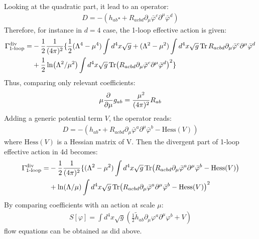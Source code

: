 Looking at the quadratic part, it lead to an operator:
\begin{align}
    D = -(h_{ab} \square + R_{acbd} \partial _{\mu} \bar{\varphi}^{c} \partial ^{\mu} \bar{\varphi}^{d} )
\end{align}
Therefore, for instance in $d=4$ case, the 1-loop effective action is given:
\begin{align}
    \begin{split}
    \Gamma _{\text{1-loop}} ^{\text{div}} = &-\frac{1}{2} \frac{1}{(4\pi)^2}\lbrace \frac{1}{2}(\Lambda^4 - \mu ^{4}) \int d^{4}x \sqrt{g} + (\Lambda ^{2} - \mu ^{2}) \int d^{4}x \sqrt{g} \Tr R_{acbd} \partial _{\mu} \bar{\varphi}^{c} \partial ^{\mu} \bar{\varphi}^{d} \\ 
    &+ \frac{1}{2} \ln (\Lambda ^{2} / \mu ^{2})\int d^{4}x  \sqrt{g} \Tr (R_{acbd} \partial _{\mu} \bar{\varphi}^{c} \partial ^{\mu} \bar{\varphi}^{d}) ^{2} \rbrace
    \end{split}
\end{align}
Thus, comparing only relevant coefficients:
\begin{align}
    \mu \pdv{\mu} g_{ab} = \frac{\mu ^{2}} {(4\pi)^2} R_{ab}
\end{align}
Adding a generic potential term $V$, the operator reads:
\begin{align}
    D = -(h_{ab}\square + R_{acbd} \partial_{\mu} \bar{\varphi} ^{a} \partial^{\mu} \bar{\varphi} ^{b} - \text{Hess} (V))
\end{align}
where $\text{Hess}(V)$ is a Hessian matrix of V. Then the divergent part of 1-loop effective action in 4d becomes:
\begin{align}
    \begin{split}
    \Gamma_{\text{1-loop}}^{\text{div}} = &-\frac{1}{2} \frac{1}{(4\pi)^{2}}\lbrace (\Lambda ^{2} - \mu ^{2})\int d^{4}x \sqrt{g} \Tr (R_{acbd} \partial_{\mu} \bar{\varphi} ^{a} \partial^{\mu} \bar{\varphi} ^{b} - \text{Hess} (V)) \\ 
    &+ \ln (\Lambda/\mu)\int d^{4}x \sqrt{g} \Tr(R_{acbd} \partial_{\mu} \bar{\varphi} ^{a} \partial^{\mu} \bar{\varphi} ^{b} - \text{Hess} (V))^{2}
    \end{split}
\end{align}
By comparing coefficients with an action at scale $\mu$:
\begin{align}
    S[\varphi] = \int d^{4}x \sqrt{g} (\frac{1}{2} \tilde h_{ab} \partial _{\mu} \varphi^{a} \partial ^{\mu} \varphi ^{b} + V)
\end{align}
flow equations can be obtained as did above.

